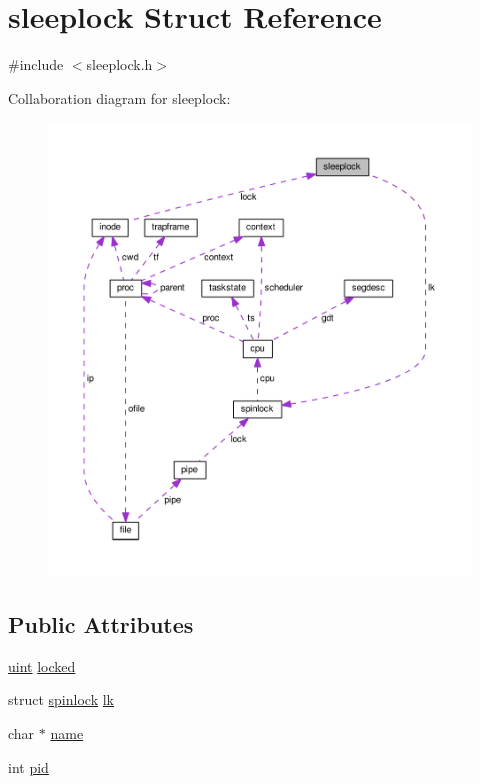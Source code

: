 \hypertarget{structsleeplock}{}\section{sleeplock Struct Reference}
\label{structsleeplock}


{\ttfamily \#include $<$sleeplock.\+h$>$}



Collaboration diagram for sleeplock\+:\nopagebreak
\begin{figure}[H]
\begin{center}
\leavevmode
\includegraphics[width=350pt]{d9/d0a/structsleeplock__coll__graph}
\end{center}
\end{figure}
\subsection*{Public Attributes}
\begin{DoxyCompactItemize}
\item 
\hyperlink{types_8h_a91ad9478d81a7aaf2593e8d9c3d06a14}{uint} \hyperlink{structsleeplock_ac5cfe608994a41b24cb1c0fd722910c3}{locked}
\item 
struct \hyperlink{structspinlock}{spinlock} \hyperlink{structsleeplock_a077241ea0e720d228d853208444c4c9d}{lk}
\item 
char $\ast$ \hyperlink{structsleeplock_a40f1db61da688063cd5ac4f72d839590}{name}
\item 
int \hyperlink{structsleeplock_a99a4c6a784956ab1c391a12af475a55e}{pid}
\end{DoxyCompactItemize}


